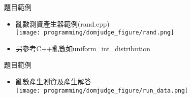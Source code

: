 \documentclass[aspectratio=169,xcolor=dvipsnames]{beamer}
\begin{document}
    \begin{frame}{題目範例}
        \begin{itemize}
            \item 亂數測資產生器範例(rand.cpp) \\
                \vspace{0.5em}
                \texttt{[image: programming/domjudge\_figure/rand.png]}
            \item 另參考C++亂數如uniform\_int\_distribution
        \end{itemize}
    \end{frame}
    
    \begin{frame}{題目範例}
        \begin{itemize}
            \item 亂數產生測資及產生解答 \\
            \vspace{0.5em}
            \texttt{[image: programming/domjudge\_figure/run\_data.png]}
        \end{itemize}
    \end{frame}
    
    
    
\end{document}
